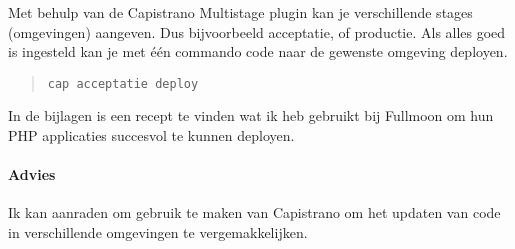 Met behulp van de Capistrano Multistage plugin\cite{capistranomultistage} kan je verschillende stages (omgevingen) aangeven. Dus bijvoorbeeld acceptatie, of productie. Als alles goed is ingesteld kan je met \'{e}\'{e}n commando code naar de gewenste omgeving deployen.

\begin{quote}
  \texttt{cap acceptatie deploy}
\end{quote}

In de bijlagen is een recept te vinden wat ik heb gebruikt bij Fullmoon om hun PHP applicaties succesvol te kunnen deployen.

\paragraph{Advies} Ik kan aanraden om gebruik te maken van Capistrano om het updaten van code in verschillende omgevingen te vergemakkelijken.
